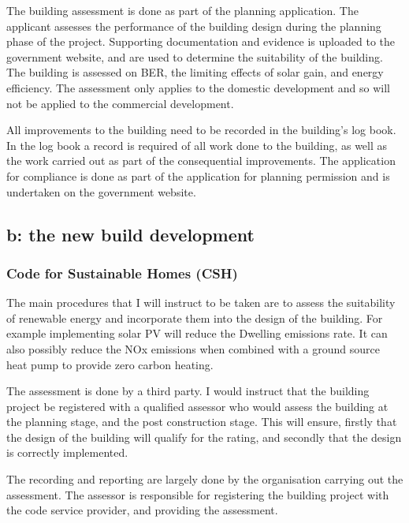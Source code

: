 \documentclass[a4paper,fleqn]{article}
\begin{document}
The building assessment is done as part of the planning application. The applicant assesses the performance of the 
building design during the planning phase of the project. Supporting documentation and evidence is uploaded to the 
government website, and are used to determine the suitability of the building. The building is assessed on BER, 
the limiting effects of solar gain, and energy efficiency. The assessment only applies to the domestic development 
and so will not be applied to the commercial development.



All improvements to the building need to be recorded in the building's log book. In the log book a record is 
required of all work done to the building, as well as the work carried out as part of the consequential 
improvements. The application for compliance is done as part of the application for planning permission and is 
undertaken on the government website.




\subsection*{b: the new build development}
\subsubsection*{Code for Sustainable Homes (CSH)}
The main procedures that I will instruct to be taken are to assess the suitability of renewable energy and 
incorporate them into the design of the building. For example implementing solar PV will reduce the Dwelling 
emissions rate. It can also possibly reduce the NOx emissions when combined with a ground source heat pump to 
provide zero carbon heating.

The assessment is done by a third party. I would instruct that the building project be registered with a qualified 
assessor who would assess the building at the planning stage, and the post construction stage. This will ensure, 
firstly that the design of the building will qualify for the rating, and secondly that the design is correctly 
implemented.



The recording and reporting are largely done by the organisation carrying out the assessment. The assessor is 
responsible for registering the building project with the code service provider, and providing the assessment. 
\end{document}
